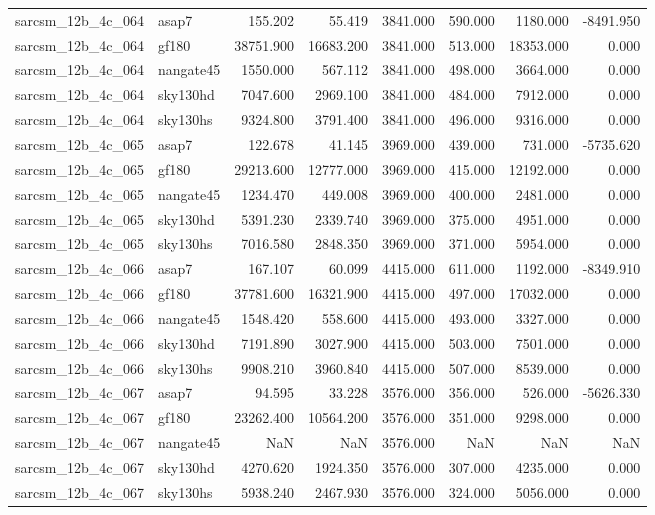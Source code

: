 \begin{tabular}{llrrrrrr}
sarcsm\_12b\_4c\_064 & asap7 & 155.202 & 55.419 & 3841.000 & 590.000 & 1180.000 & -8491.950 \\
sarcsm\_12b\_4c\_064 & gf180 & 38751.900 & 16683.200 & 3841.000 & 513.000 & 18353.000 & 0.000 \\
sarcsm\_12b\_4c\_064 & nangate45 & 1550.000 & 567.112 & 3841.000 & 498.000 & 3664.000 & 0.000 \\
sarcsm\_12b\_4c\_064 & sky130hd & 7047.600 & 2969.100 & 3841.000 & 484.000 & 7912.000 & 0.000 \\
sarcsm\_12b\_4c\_064 & sky130hs & 9324.800 & 3791.400 & 3841.000 & 496.000 & 9316.000 & 0.000 \\
sarcsm\_12b\_4c\_065 & asap7 & 122.678 & 41.145 & 3969.000 & 439.000 & 731.000 & -5735.620 \\
sarcsm\_12b\_4c\_065 & gf180 & 29213.600 & 12777.000 & 3969.000 & 415.000 & 12192.000 & 0.000 \\
sarcsm\_12b\_4c\_065 & nangate45 & 1234.470 & 449.008 & 3969.000 & 400.000 & 2481.000 & 0.000 \\
sarcsm\_12b\_4c\_065 & sky130hd & 5391.230 & 2339.740 & 3969.000 & 375.000 & 4951.000 & 0.000 \\
sarcsm\_12b\_4c\_065 & sky130hs & 7016.580 & 2848.350 & 3969.000 & 371.000 & 5954.000 & 0.000 \\
sarcsm\_12b\_4c\_066 & asap7 & 167.107 & 60.099 & 4415.000 & 611.000 & 1192.000 & -8349.910 \\
sarcsm\_12b\_4c\_066 & gf180 & 37781.600 & 16321.900 & 4415.000 & 497.000 & 17032.000 & 0.000 \\
sarcsm\_12b\_4c\_066 & nangate45 & 1548.420 & 558.600 & 4415.000 & 493.000 & 3327.000 & 0.000 \\
sarcsm\_12b\_4c\_066 & sky130hd & 7191.890 & 3027.900 & 4415.000 & 503.000 & 7501.000 & 0.000 \\
sarcsm\_12b\_4c\_066 & sky130hs & 9908.210 & 3960.840 & 4415.000 & 507.000 & 8539.000 & 0.000 \\
sarcsm\_12b\_4c\_067 & asap7 & 94.595 & 33.228 & 3576.000 & 356.000 & 526.000 & -5626.330 \\
sarcsm\_12b\_4c\_067 & gf180 & 23262.400 & 10564.200 & 3576.000 & 351.000 & 9298.000 & 0.000 \\
sarcsm\_12b\_4c\_067 & nangate45 & NaN & NaN & 3576.000 & NaN & NaN & NaN \\
sarcsm\_12b\_4c\_067 & sky130hd & 4270.620 & 1924.350 & 3576.000 & 307.000 & 4235.000 & 0.000 \\
sarcsm\_12b\_4c\_067 & sky130hs & 5938.240 & 2467.930 & 3576.000 & 324.000 & 5056.000 & 0.000 \\

\end{tabular}
